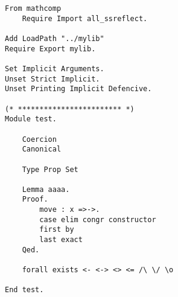 \documentclass[twocolumn]{jsarticle}
\begin{document}
\begin{lstlisting}
From mathcomp
	Require Import all_ssreflect.

Add LoadPath "../mylib"
Require Export mylib.

Set Implicit Arguments.
Unset Strict Implicit.
Unset Printing Implicit Defencive.

(* ************************ *)
Module test.

	Coercion
	Canonical

	Type Prop Set

	Lemma aaaa.
	Proof.
		move : x =>->.
		case elim congr constructor
		first by
		last exact
	Qed.

	forall exists <- <-> <> <= /\ \/ \o

End test.
\end{lstlisting}
\end{document}
